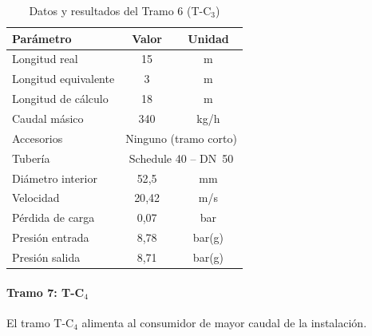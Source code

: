 \begin{table}[H]
	\centering
	\caption{Datos y resultados del Tramo 6 (T-C$_3$)}
	\label{tab:tramo6}
	\begin{tabular}{lcc}
		\toprule
		\textbf{Parámetro}   & \textbf{Valor}                            & \textbf{Unidad} \\
		\midrule
		Longitud real        & 15                                        & m               \\
		Longitud equivalente & 3                                         & m               \\
		Longitud de cálculo  & 18                                        & m               \\
		Caudal másico        & 340                                       & kg/h            \\
		Accesorios           & \multicolumn{2}{c}{Ninguno (tramo corto)}                   \\
		Tubería              & \multicolumn{2}{c}{Schedule 40 -- DN~50}                    \\
		Diámetro interior    & 52{,}5                                    & mm              \\
		Velocidad            & 20{,}42                                   & m/s             \\
		Pérdida de carga     & 0{,}07                                    & bar             \\
		Presión entrada      & 8{,}78                                    & bar(g)          \\
		Presión salida       & 8{,}71                                    & bar(g)          \\
		\bottomrule
	\end{tabular}
\end{table}

\paragraph{Tramo 7: T-C$_4$}

El tramo T-C$_4$ alimenta al consumidor de mayor caudal de la instalación.

